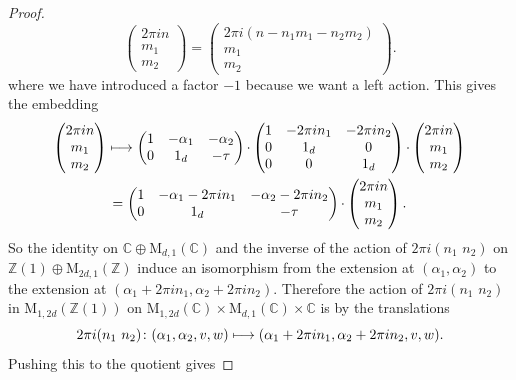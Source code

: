 \documentclass[JEP,XML,SOM,Unicode,NoFloatCountersInSection]{cedram}
\def\mto{\mathchoice{\longmapsto}{\mapsto}{\mapsto}{\mapsto}}
\theoremstyle{plain}
\theoremstyle{definition}
\numberwithin{equation}{subsection}
\renewcommand{\C}{\mathbb C}
\newcommand{\Z}{\mathbb Z}
\newcommand{\rmM}{\mathrm{M}}
\begin{document}
\begin{proof}
\[\begin{pmatrix}
2\pi in \\ m_1\\ m_2
\end{pmatrix}
 =
\begin{pmatrix}
2\pi i(n - n_1m_1 - n_2m_2) \\ m_1\\ m_2
\end{pmatrix}.
\]
where we have introduced a factor $-1$ because we want a left
action. This gives the embedding
\begin{multline*}
\begin{pmatrix}
2\pi in \\ m_1\\ m_2
\end{pmatrix}
 \mto
\begin{pmatrix}
1 & -\alpha_1 & -\alpha_2\\0 & 1_d & -\tau
\end{pmatrix}{\cdot}
\begin{pmatrix}
1 & -2\pi in_1 & -2\pi i n_2\\
0 & 1_d & 0 \\
0 & 0 & 1_d
\end{pmatrix} {\cdot}
\begin{pmatrix}
2\pi in \\ m_1\\ m_2
\end{pmatrix} \\
 =
\begin{pmatrix}
1 & -\alpha_1-2\pi i n_1 & -\alpha_2-2\pi i n_2\\0 & 1_d & -\tau
\end{pmatrix}{\cdot}
\begin{pmatrix}
2\pi in \\ m_1\\ m_2
\end{pmatrix}.
\end{multline*}
So the identity on $\C\oplus\rmM_{d,1}(\C)$ and the inverse of the
action of $2\pi i(n_1\,\, n_2)$ on $\Z(1)\oplus\rmM_{2d,1}(\Z)$ induce
an isomorphism from the extension at $(\alpha_1,\alpha_2)$ to the
extension at $(\alpha_1+2\pi i n_1, \alpha_2+2\pi i n_2)$.
Therefore the action of $2\pi i(n_1\,\, n_2)$ in $\rmM_{1,2d}(\Z(1))$
on $\rmM_{1,2d}(\C)\times \rmM_{d,1}(\C)\times\C$ is by the translations
\[
2\pi i(n_1\,\, n_2)\colon (\alpha_1,\alpha_2,v,w)\mto
(\alpha_1+2\pi i n_1, \alpha_2+2\pi i n_2, v, w).
\]
Pushing this to the quotient gives

\end{proof}
\end{document}
